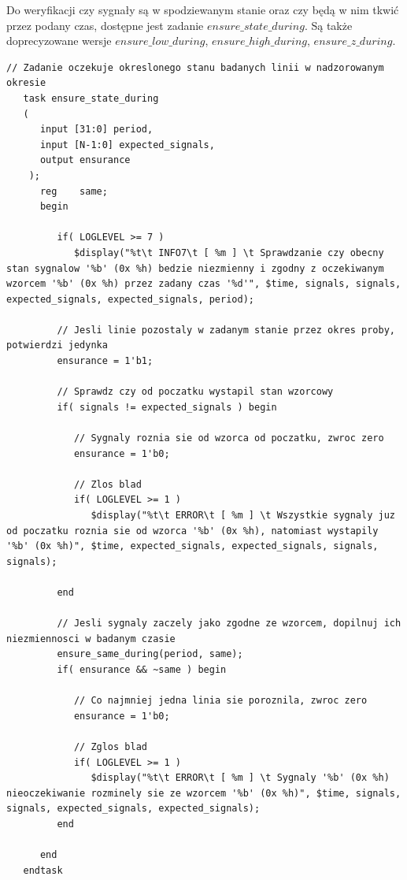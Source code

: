 \documentclass[a4paper,12pt]{article}
\begin{document}
Do weryfikacji czy sygnały są w spodziewanym stanie oraz czy będą w nim tkwić przez podany czas, dostępne jest zadanie $ensure\_state\_during$. Są także doprecyzowane wersje $ensure\_low\_during$, $ensure\_high\_during$, $ensure\_z\_during$.
\begin{lstlisting}[label=Monitor,caption=Monitor.v,firstnumber=138]
   // Zadanie oczekuje okreslonego stanu badanych linii w nadzorowanym okresie
   task ensure_state_during
   (
      input [31:0] period,
      input [N-1:0] expected_signals,
      output ensurance
    );
      reg    same;
      begin

         if( LOGLEVEL >= 7 )
            $display("%t\t INFO7\t [ %m ] \t Sprawdzanie czy obecny stan sygnalow '%b' (0x %h) bedzie niezmienny i zgodny z oczekiwanym wzorcem '%b' (0x %h) przez zadany czas '%d'", $time, signals, signals, expected_signals, expected_signals, period);

         // Jesli linie pozostaly w zadanym stanie przez okres proby, potwierdzi jedynka
         ensurance = 1'b1;

         // Sprawdz czy od poczatku wystapil stan wzorcowy
         if( signals != expected_signals ) begin

            // Sygnaly roznia sie od wzorca od poczatku, zwroc zero
            ensurance = 1'b0;

            // Zlos blad
            if( LOGLEVEL >= 1 )
               $display("%t\t ERROR\t [ %m ] \t Wszystkie sygnaly juz od poczatku roznia sie od wzorca '%b' (0x %h), natomiast wystapily '%b' (0x %h)", $time, expected_signals, expected_signals, signals, signals);

         end

         // Jesli sygnaly zaczely jako zgodne ze wzorcem, dopilnuj ich niezmiennosci w badanym czasie
         ensure_same_during(period, same);
         if( ensurance && ~same ) begin

            // Co najmniej jedna linia sie poroznila, zwroc zero
            ensurance = 1'b0;

            // Zglos blad
            if( LOGLEVEL >= 1 )
               $display("%t\t ERROR\t [ %m ] \t Sygnaly '%b' (0x %h) nieoczekiwanie rozminely sie ze wzorcem '%b' (0x %h)", $time, signals, signals, expected_signals, expected_signals);
         end

      end
   endtask
\end{lstlisting}
\end{document}
